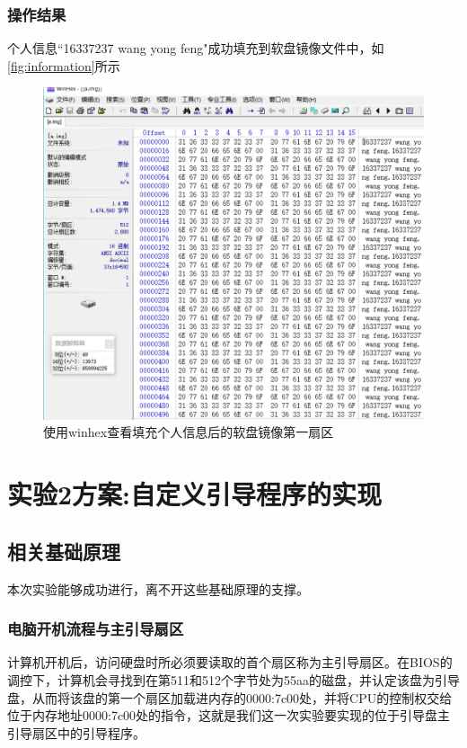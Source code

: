 \documentclass[forprint]{WHUBachelor}
\begin{document}
\subsection{操作结果}

个人信息“16337237 wang yong feng"成功填充到软盘镜像文件中，如\autoref{fig:information}所示

\begin{figure}[htp]
  \centering
  \includegraphics[width=14cm]{"./figure/information.png"}
  \caption{使用winhex查看填充个人信息后的软盘镜像第一扇区}
  \label{fig:information}
\end{figure}


\chapter{实验2方案:自定义引导程序的实现}

\section{相关基础原理}

本次实验能够成功进行，离不开这些基础原理的支撑。

\subsection{电脑开机流程与主引导扇区}

计算机开机后，访问硬盘时所必须要读取的首个扇区称为主引导扇区\cite{wiki:mainbootrecord}。在BIOS的调控下，计算机会寻找到在第511和512个字节处为55aa的磁盘，并认定该盘为引导盘，从而将该盘的第一个扇区加载进内存的0000:7c00处，并将CPU的控制权交给位于内存地址0000:7c00处的指令，这就是我们这一次实验要实现的位于引导盘主引导扇区中的引导程序。
\end{document}
